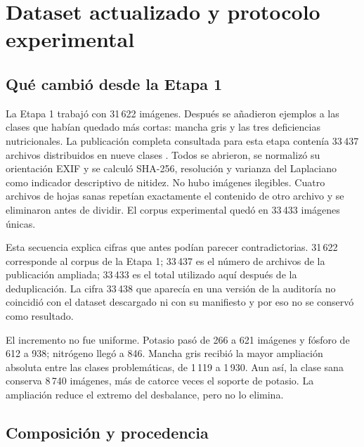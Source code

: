 \section{Dataset actualizado y protocolo experimental}

\subsection{Qué cambió desde la Etapa 1}

La Etapa 1 trabajó con 31\,622 imágenes. Después se añadieron ejemplos a las
clases que habían quedado más cortas: mancha gris y las tres deficiencias
nutricionales. La publicación completa consultada para esta etapa contenía
33\,437 archivos distribuidos en nueve clases \citep{huggingface2026maize}.
Todos se abrieron, se normalizó su orientación EXIF y se calculó SHA-256,
resolución y varianza del Laplaciano como indicador descriptivo de nitidez.
No hubo imágenes ilegibles. Cuatro archivos de hojas sanas repetían exactamente
el contenido de otro archivo y se eliminaron antes de dividir. El corpus
experimental quedó en 33\,433 imágenes únicas.

Esta secuencia explica cifras que antes podían parecer contradictorias.
31\,622 corresponde al corpus de la Etapa 1; 33\,437 es el número de archivos
de la publicación ampliada; 33\,433 es el total utilizado aquí después de la
deduplicación. La cifra 33\,438 que aparecía en una versión de la auditoría no
coincidió con el dataset descargado ni con su manifiesto y por eso no se
conservó como resultado.

\begin{table}[H]
  \centering
  \caption{Composición por clase antes y después de la ampliación. La fuente es
  el manifiesto generado, no una transcripción manual.}
  \label{tab:dataset-e1-e2}
  \small
  
\end{table}

El incremento no fue uniforme. Potasio pasó de 266 a 621 imágenes y fósforo de
612 a 938; nitrógeno llegó a 846. Mancha gris recibió la mayor ampliación
absoluta entre las clases problemáticas, de 1\,119 a 1\,930. Aun así, la clase
sana conserva 8\,740 imágenes, más de catorce veces el soporte de potasio. La
ampliación reduce el extremo del desbalance, pero no lo elimina.

\subsection{Composición y procedencia}

